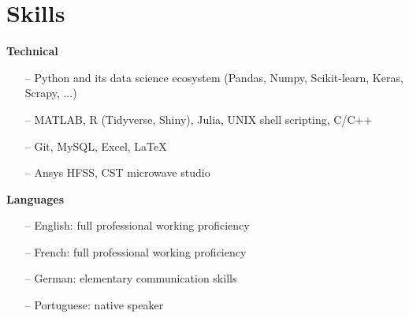\section{Skills} 

{\bf Technical} \\
\begin{itemize}
	\item[--] Python and its data science ecosystem (Pandas, Numpy, Scikit-learn, Keras, Scrapy, ...)
	\item[--] MATLAB, R (Tidyverse, Shiny), Julia, UNIX shell scripting, C/C++
	\item[--] Git, MySQL, Excel, \LaTeX
	\item[--] Ansys HFSS, CST microwave studio
\end{itemize}

{\bf Languages} \\
\begin{itemize}
	\item[--] English: full professional working proficiency
	\item[--] French: full professional working proficiency
	\item[--] German: elementary communication skills
	\item[--] Portuguese: native speaker
\end{itemize}